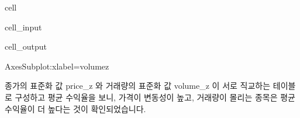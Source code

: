 \documentclass[letterpaper,10pt,english]{jupyterBook}
\begin{document}
\begin{sphinxuseclass}{cell}\begin{sphinxVerbatimInput}

\begin{sphinxuseclass}{cell_input}
\begin{sphinxVerbatim}[commandchars=\\\{\}]
  \PYG{p}{[}\PYG{p}{]}  
\PYG{p}{[}\PYG{p}{]}
\end{sphinxVerbatim}

\end{sphinxuseclass}\end{sphinxVerbatimInput}
\begin{sphinxVerbatimOutput}

\begin{sphinxuseclass}{cell_output}
\begin{sphinxVerbatim}[commandchars=\\\{\}]
\PYGZlt{}AxesSubplot:xlabel=\PYGZsq{}volume\PYGZus{}z\PYGZsq{}\PYGZgt{}
\end{sphinxVerbatim}

\noindent{}

\end{sphinxuseclass}\end{sphinxVerbatimOutput}

\end{sphinxuseclass}
\sphinxAtStartPar
 종가의 표준화 값 price\_z 와 거래량의 표준화 값 volume\_z 이 서로 직교하는 테이블로 구성하고 평균 수익율을 보니, 가격이 변동성이 높고, 거래량이 몰리는 종목은 평균 수익율이 더 높다는 것이 확인되었습니다.
\end{document}

